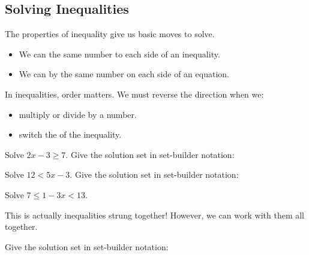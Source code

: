 \subsection{Solving Inequalities} 
The properties of inequality give us basic moves to solve.
\begin{itemize}
\item We can \makeblank[1in] the same number to each side of an inequality.
\item We can \makeblank[1.5in] by the same number on each side of an equation.
\end{itemize}
In inequalities, order matters. We must reverse the direction when we:
\begin{itemize}
\item multiply or divide by a \makeblank[1.5in] number.
\item switch the \makeblank[1.5in] of the inequality.
\end{itemize}
\begin{Example}
Solve $2x-3\geq 7$.
Give the solution set in set-builder notation: \makeblank
\end{Example}
\begin{Example}
Solve $12<5x-3$.
Give the solution set in set-builder notation: \makeblank
\end{Example}
\begin{Example}
Solve $7\leq 1-3x < 13$.
\begin{Note}This is actually \makeblank[1in] inequalities strung together! However, we can work with them all together.\end{Note}
Give the solution set in set-builder notation: \makeblank
\end{Example}